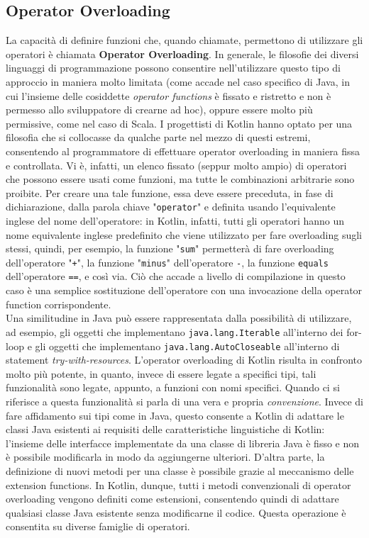 \subsection{Operator Overloading}
La capacità di definire funzioni che, quando chiamate, permettono di utilizzare gli operatori è chiamata
{\bfseries Operator Overloading}. In generale, le filosofie dei diversi linguaggi di programmazione possono consentire nell'utilizzare questo tipo di approccio in maniera molto limitata (come accade nel caso specifico di Java, in cui l'insieme delle cosiddette {\em operator functions} è fissato e ristretto e non è permesso allo sviluppatore di crearne ad hoc), oppure essere molto più permissive, come nel caso di Scala. I progettisti di Kotlin hanno optato per una filosofia che si collocasse da qualche parte nel mezzo di questi estremi, consentendo al programmatore di effettuare operator overloading in maniera fissa e controllata. Vi è, infatti, un elenco fissato (seppur molto ampio) di operatori che possono essere usati come funzioni, ma tutte le combinazioni arbitrarie sono proibite. Per creare una tale funzione, essa deve essere preceduta, in fase di dichiarazione, dalla parola chiave "\texttt{operator}" e definita usando l'equivalente inglese del nome dell'operatore: in Kotlin, infatti, tutti gli operatori hanno un nome equivalente inglese predefinito che viene utilizzato per fare overloading sugli stessi, quindi, per esempio, la funzione "\texttt{sum}" permetterà di fare overloading dell'operatore "\texttt{+}", la funzione "\texttt{minus}" dell'operatore {\texttt{-}}, la funzione \texttt{equals} dell'operatore \texttt{==}, e così via. Ciò che accade a livello di compilazione in questo caso è una semplice sostituzione dell'operatore con una invocazione della operator function corrispondente.\\
Una similitudine in Java può essere rappresentata dalla possibilità di utilizzare, ad esempio, gli oggetti che implementano \texttt{java.lang.Iterable} all'interno dei for-loop e gli oggetti che implementano \texttt{java.lang.AutoCloseable} all'interno di statement {\em try-with-resources}. L'operator overloading di Kotlin risulta in confronto molto più potente, in quanto, invece di essere legate a specifici tipi, tali funzionalità sono legate, appunto, a funzioni con nomi specifici. Quando ci si riferisce a questa funzionalità si parla di una vera e propria {\em convenzione}. Invece di fare affidamento sui tipi come in Java, questo consente a Kotlin di adattare le classi Java esistenti ai requisiti delle caratteristiche linguistiche di Kotlin: l'insieme delle interfacce implementate da una classe di libreria Java è fisso e non è possibile modificarla in modo da aggiungerne ulteriori. D'altra parte, la definizione di nuovi metodi per una classe è possibile grazie al meccanismo delle extension functions. In Kotlin, dunque, tutti i metodi convenzionali di operator overloading vengono definiti come estensioni, consentendo quindi di adattare qualsiasi classe Java esistente senza modificarne il codice. Questa operazione è consentita su diverse famiglie di operatori.\\

